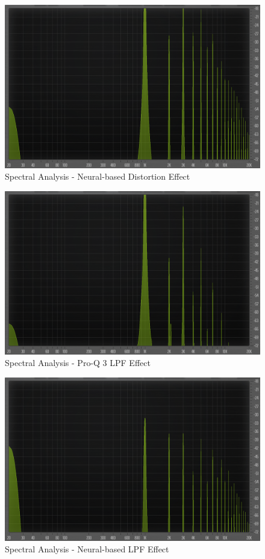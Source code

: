\documentclass{article}
\begin{document}
\begin{sloppy}
\begin{figure}[t]
  \centering
  \centerline{\includegraphics[width=0.95\columnwidth]{./images/dist magicknob.png}}
  \caption{Spectral Analysis - Neural-based Distortion Effect}
  \label{fig:ourDist}
\end{figure}

\begin{figure}[t]
  \centering
  \centerline{\includegraphics[width=0.95\columnwidth]{./images/dist lpf vera.png}}
  \caption{Spectral Analysis - Pro-Q 3 LPF Effect}
  \label{fig:proqLpf}
\end{figure}

\begin{figure}[t]
  \centering
  \centerline{\includegraphics[width=0.95\columnwidth]{./images/dist lpf magicknob.png}}
  \caption{Spectral Analysis - Neural-based LPF Effect}
  \label{fig:ourLpf}
\end{figure}


\end{sloppy}
\end{document}
